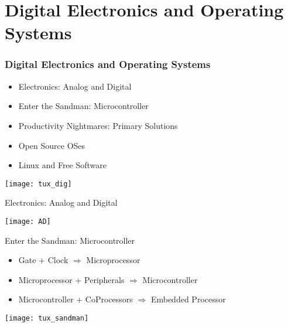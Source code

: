 \section{Digital Electronics and Operating Systems}

\begin{frame}
  \frametitle{Digital Electronics and Operating Systems}
  
  \begin{itemize}
      \item Electronics: Analog and Digital
      \item Enter the Sandman: Microcontroller
      \item Productivity Nightmares: Primary Solutions
      \item Open Source OSes
      \item Linux and Free Software
  \end{itemize}
  
    \centering
  \texttt{[image: tux\_dig]}  
  
\end{frame}


\begin{frame}{Electronics: Analog and Digital}

\texttt{[image: AD]}

\end{frame}


\begin{frame}{Enter the Sandman: Microcontroller}

\begin{itemize}
    \item 
Gate + Clock $\Rightarrow$ Microprocessor
    \item 
Microprocessor + Peripherals $\Rightarrow$ Microcontroller
    \item 
Microcontroller + CoProcessors $\Rightarrow$ Embedded Processor
\end{itemize}

    \centering
  \texttt{[image: tux\_sandman]}

\end{frame}


